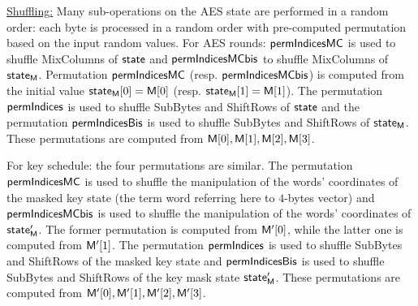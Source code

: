 \noindent \underline{Shuffling:} Many sub-operations on the AES state are performed in a random order: each byte is processed in a random order with pre-computed permutation based on the input random values.
For AES rounds:
$\mathsf{permIndicesMC}$ is used to shuffle MixColumns of $\mathsf{state}$ and $\mathsf{permIndicesMCbis}$ to shuffle MixColumns of $\mathsf{state_M}$. Permutation $\mathsf{permIndicesMC}$ (resp. $\mathsf{permIndicesMCbis}$) is computed from the initial value $\mathsf{state_M}[0]=\mathsf{M}[0]$ (resp. $\mathsf{state_M}[1]=\mathsf{M}[1]$). 
The permutation $\mathsf{permIndices}$ is used to shuffle SubBytes and ShiftRows of $\mathsf{state} $ and the permutation $\mathsf{permIndicesBis}$ is used to shuffle SubBytes and ShiftRows of $\mathsf{state_M}$. These permutations are computed from $\mathsf{M}[0], \mathsf{M}[1], \mathsf{M}[2], \mathsf{M}[3]$.

For key schedule: the four permutations are similar. 
The permutation $\mathsf{permIndicesMC}$ is used to shuffle the manipulation of the words' coordinates of the masked key state (the term word referring here to $4$-bytes vector) and $\mathsf{permIndicesMCbis}$ is used to shuffle the manipulation of the words' coordinates of $\mathsf{state'_{M}}$. The former permutation is computed from $\mathsf{M'}[0]$, while the latter one is computed from $\mathsf{M'}[1]$. 
The permutation $\mathsf{permIndices}$ is used to shuffle SubBytes and ShiftRows of the masked key state and $\mathsf{permIndicesBis}$ is used to shuffle SubBytes and ShiftRows of the key mask state $\mathsf{state'_{M}}$. These permutations are computed from $\mathsf{M'}[0], \mathsf{M'}[1], \mathsf{M'}[2], \mathsf{M'}[3]$.





